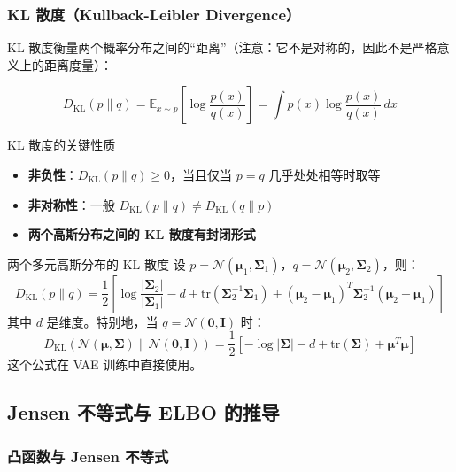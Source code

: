 \subsubsection{KL 散度（Kullback-Leibler Divergence）}

KL 散度衡量两个概率分布之间的``距离''（注意：它不是对称的，因此不是严格意义上的距离度量）：

$$D_{\mathrm{KL}}(p \| q) = \mathbb{E}_{x \sim p} \left[\log \frac{p(x)}{q(x)}\right] = \int p(x) \log \frac{p(x)}{q(x)} \, dx$$

\begin{importantbox}{KL 散度的关键性质}
\begin{itemize}
    \item \textbf{非负性}：$D_{\mathrm{KL}}(p \| q) \geq 0$，当且仅当 $p = q$ 几乎处处相等时取等
    \item \textbf{非对称性}：一般 $D_{\mathrm{KL}}(p \| q) \neq D_{\mathrm{KL}}(q \| p)$
    \item \textbf{两个高斯分布之间的 KL 散度有封闭形式}
\end{itemize}
\end{importantbox}

\begin{knowledgebox}{两个多元高斯分布的 KL 散度}
设 $p = \mathcal{N}(\boldsymbol{\mu}_1, \boldsymbol{\Sigma}_1)$，$q = \mathcal{N}(\boldsymbol{\mu}_2, \boldsymbol{\Sigma}_2)$，则：
$$D_{\mathrm{KL}}(p \| q) = \frac{1}{2}\left[\log\frac{|\boldsymbol{\Sigma}_2|}{|\boldsymbol{\Sigma}_1|} - d + \mathrm{tr}(\boldsymbol{\Sigma}_2^{-1}\boldsymbol{\Sigma}_1) + (\boldsymbol{\mu}_2 - \boldsymbol{\mu}_1)^T \boldsymbol{\Sigma}_2^{-1} (\boldsymbol{\mu}_2 - \boldsymbol{\mu}_1)\right]$$
其中 $d$ 是维度。特别地，当 $q = \mathcal{N}(\mathbf{0}, \mathbf{I})$ 时：
$$D_{\mathrm{KL}}(\mathcal{N}(\boldsymbol{\mu}, \boldsymbol{\Sigma}) \| \mathcal{N}(\mathbf{0}, \mathbf{I})) = \frac{1}{2}\left[-\log|\boldsymbol{\Sigma}| - d + \mathrm{tr}(\boldsymbol{\Sigma}) + \boldsymbol{\mu}^T\boldsymbol{\mu}\right]$$
这个公式在 VAE 训练中直接使用。
\end{knowledgebox}

\subsection{Jensen 不等式与 ELBO 的推导}

\subsubsection{凸函数与 Jensen 不等式}

